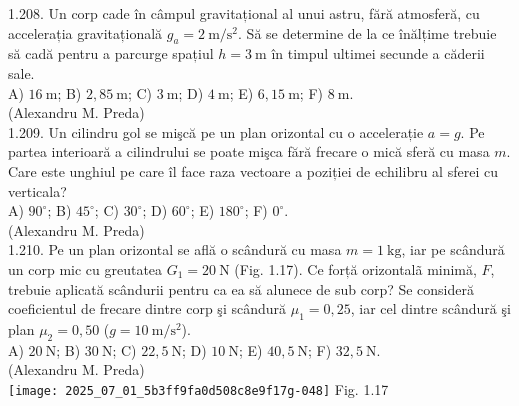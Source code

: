 1.208. Un corp cade în câmpul gravitațional al unui astru, fără atmosferă, cu accelerația gravitațională $g_{a}=2 \mathrm{~m} / \mathrm{s}^{2}$. Să se determine de la ce înălțime trebuie să cadă pentru a parcurge spațiul $h=3 \mathrm{~m}$ în timpul ultimei secunde a căderii sale.\\ A) $16 \mathrm{~m}$; B) $2,85 \mathrm{~m}$; C) $3 \mathrm{~m}$; D) $4 \mathrm{~m}$; E) $6,15 \mathrm{~m}$; F) $8 \mathrm{~m}$.\\ (Alexandru M. Preda)\\

1.209. Un cilindru gol se mişcă pe un plan orizontal cu o accelerație $a=g$. Pe partea interioară a cilindrului se poate mişca fără frecare o mică sferă cu masa $m$. Care este unghiul pe care îl face raza vectoare a poziției de echilibru al sferei cu verticala?\\ A) $90^{\circ}$; B) $45^{\circ}$; C) $30^{\circ}$; D) $60^{\circ}$; E) $180^{\circ}$; F) $0^{\circ}$.\\ (Alexandru M. Preda)\\

1.210. Pe un plan orizontal se află o scândură cu masa $m=1 \mathrm{~kg}$, iar pe scândură un corp mic cu greutatea $G_{1}=20 \mathrm{~N}$ (Fig. 1.17). Ce forță orizontalã minimă, $F$, trebuie aplicată scândurii pentru ca ea să alunece de sub corp? Se consideră coeficientul de frecare dintre corp şi scândură $\mu_{1}=0,25$, iar cel dintre scândură şi plan $\mu_{2}=0,50$ ($g=10 \mathrm{~m} / \mathrm{s}^{2}$).\\ A) $20 \mathrm{~N}$; B) $30 \mathrm{~N}$; C) $22,5 \mathrm{~N}$; D) $10 \mathrm{~N}$; E) $40,5 \mathrm{~N}$; F) $32,5 \mathrm{~N}$.\\ (Alexandru M. Preda)\\ \texttt{[image: 2025\_07\_01\_5b3ff9fa0d508c8e9f17g-048]} Fig. 1.17\\

